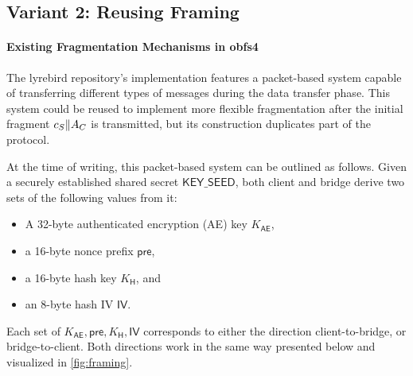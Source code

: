\subsection{Variant 2: Reusing \obfsfour{} Framing} \label{sssec:variant-framing}

\paragraph{Existing Fragmentation Mechanisms in obfs4}
The lyrebird repository's \obfsfour{} implementation features a packet-based system capable of transferring different types of messages during the data transfer phase. This system could be reused to implement more flexible fragmentation after the initial fragment $c_S \| A_C$ is transmitted, but its construction duplicates part of the \drivel{} protocol.

At the time of writing, this packet-based system can be outlined as follows. Given a securely established shared secret $\mathsf{KEY\_SEED}$, both client and bridge derive two sets of the following values from it:
\begin{itemize}
    \item A 32-byte authenticated encryption (AE) key $K_\mathsf{AE}$,
    \item a 16-byte nonce prefix $\mathsf{pre}$,
    \item a 16-byte hash key $K_\mathsf{H}$, and
    \item an 8-byte hash IV $\mathsf{IV}$.
\end{itemize}

Each set of $K_\mathsf{AE}, \mathsf{pre}, K_\mathsf{H}, \mathsf{IV}$ corresponds to either the direction client-to-bridge, or bridge-to-client. Both directions work in the same way presented below and visualized in \cref{fig:framing}.

